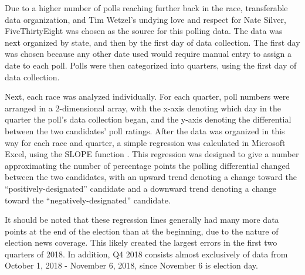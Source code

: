 \documentclass[11pt]{article}
\begin{document}
Due to a higher number of polls reaching further back in the race, transferable
data organization, and Tim Wetzel's undying love and respect for Nate Silver,
FiveThirtyEight was chosen as the source for this polling data. The data was
next organized by state, and then by the first day of data collection. The
first day was chosen because any other date used would require manual entry to
assign a date to each poll. Polls were then categorized into quarters, using
the first day of data collection.

Next, each race was analyzed individually. For each quarter, poll numbers were
arranged in a 2-dimensional array, with the x-axis denoting which day in the
quarter the poll's data collection began, and the y-axis denoting the
differential between the two candidates' poll ratings. After the data was
organized in this way for each race and quarter, a simple regression was
calculated in Microsoft Excel, using the SLOPE function \cite{slope}. This
regression was designed to give a number approximating the number of percentage
points the polling differential changed between the two candidates, with an
upward trend denoting a change toward the ``positively-designated'' candidate
and a downward trend denoting a change toward the ``negatively-designated''
candidate.

It should be noted that these regression lines generally had many more data
points at the end of the election than at the beginning, due to the nature of
election news coverage. This likely created the largest errors in the first two
quarters of 2018. In addition, Q4 2018 consists almost exclusively of data from
October 1, 2018 - November 6, 2018, since November 6 is election day.
\end{document}
